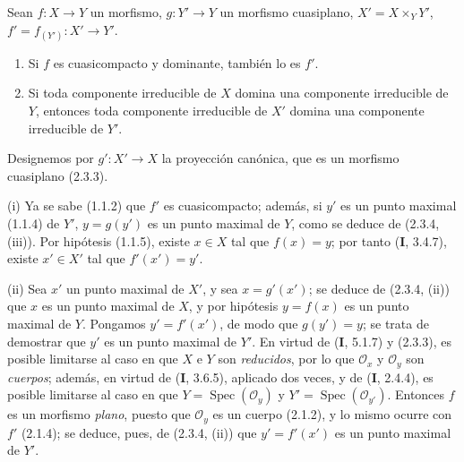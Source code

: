 \begin{proposition}[2.3.7]
\label{IV.2.3.7-fr}
Sean $f:X\to Y$ un morfismo, $g:Y'\to Y$ un morfismo cuasiplano,
$X'=X\times_Y Y'$, $f'=f_{(Y')}:X'\to Y'$.
\begin{enumerate}
  \item[\textup{(i)}] Si $f$ es cuasicompacto y dominante, también lo es $f'$.
  \item[\textup{(ii)}] Si toda componente irreducible de $X$ domina una componente
  irreducible de $Y$, entonces toda componente irreducible de $X'$ domina una
  componente irreducible de $Y'$.
\end{enumerate}
\end{proposition}

Designemos por $g':X'\to X$ la proyección canónica, que es un morfismo
cuasiplano (2.3.3).

(i) Ya se sabe (1.1.2) que $f'$ es cuasicompacto; además, si $y'$ es un punto
maximal (1.1.4) de $Y'$, $y=g(y')$ es un punto maximal de $Y$, como se deduce
de (2.3.4, (iii)). Por hipótesis (1.1.5), existe $x\in X$ tal que
$f(x)=y$; por tanto (\textbf I, 3.4.7), existe $x'\in X'$ tal que $f'(x')=y'$.

(ii) Sea $x'$ un punto maximal de $X'$, y sea $x=g'(x')$; se deduce de
(2.3.4, (ii)) que $x$ es un punto maximal de $X$, y por hipótesis $y=f(x)$ es
un punto maximal de $Y$. Pongamos $y'=f'(x')$, de modo que $g(y')=y$; se trata
de demostrar que $y'$ es un punto maximal de $Y'$. En virtud de (\textbf I, 5.1.7) y
(2.3.3), es posible limitarse al caso en que $X$ e $Y$ son \emph{reducidos}, por
lo que $\mathcal O_x$ y $\mathcal O_y$ son \emph{cuerpos}; además, en virtud
de (\textbf I, 3.6.5), aplicado dos veces, y de (\textbf I, 2.4.4), es posible limitarse al caso
en que $Y=\operatorname{Spec}(\mathcal O_y)$ y
$Y'=\operatorname{Spec}(\mathcal O_{y'})$. Entonces $f$ es un morfismo
\emph{plano}, puesto que $\mathcal O_y$ es un cuerpo (2.1.2), y lo mismo
ocurre con $f'$ (2.1.4); se deduce, pues, de (2.3.4, (ii)) que $y'=f'(x')$ es
un punto maximal de $Y'$.
